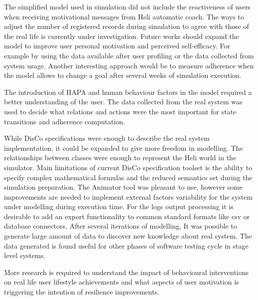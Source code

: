 \documentclass[graybox]{svmult}
\begin{document}
The simplified model used in simulation did not include the reactiveness of users when receiving motivational messages from Heli automatic coach. The ways to adjust the number of registered records during simulation to agree with those of the real life is currently under investigation. Future works should expand the model to improve user personal motivation and perceived self-efficacy. For example by using the data available after user profiling or the data collected from system usage.  Another interesting approach would be to measure adherence when the model allows to change a goal after several weeks of simulation execution.

The introduction of  HAPA and human behaviour factors in the model required a better understanding of the user. The data collected from the real system was used to decide what relations and actions were the most important for state transitions and adherence computation.

While DisCo specifications were enough to describe the real system implementation, it could be expanded to give more freedom in modelling. The relationships between classes were enough to represent the Heli world in the simulator. Main limitations of current DisCo specification toolset is the ability to specify complex mathematical formulas and the reduced semantics set during the simulation preparation. The Animator tool was pleasant to use, however some improvements are needed to implement  external factors variability for the system under modelling during execution time. For the logs output processing it is desirable to add an export functionality to common standard formats like csv or database connectors. After several iterations of modelling, It was possible to generate large amount of data to discover new knowledge about real system. The data generated is found useful for other phases of software testing cycle in stage level systems. 

More research is required to understand the impact of behavioural interventions on real life user lifestyle achievements and what aspects of user motivation is triggering the intention of resilience improvements.
\end{document}
